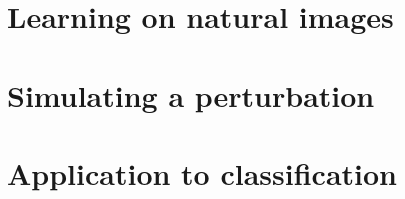 \author{
{\FirstNameA\ \AuthorA\ } 
{\FirstNameB\ \AuthorB\ }
}

\institute{
{\InstituteA }  --- %
{\InstituteB }
}           

\conference{\Conference}


   
\maketitle

\begin{multicols}{4}

\begin{abstract}
\Abstract
\end{abstract}

%

\section{Learning on natural images}
\FigureMap

\columnbreak
\section{Simulating a perturbation}
\FigureQuant

\columnbreak
\section{Application to classification}
\FigureMNIST

\end{multicols}

